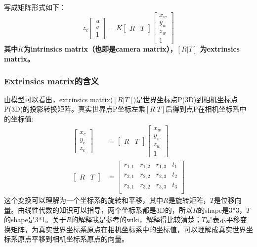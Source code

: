 \documentclass[UTF8]{ctexart}
\begin{document}
写成矩阵形式如下：
\begin{equation}       %
z_c \left[ \begin{array}{c}  u \\ v \\  1 \end{array} \right] =
K \left[ \begin{array}{c|c} R & T   \end{array} \right] \left[ \begin{array}{c}   x_w \\  y_w \\  z_w \\ 1 \end{array}\right]
\end{equation}
\textbf{其中$K$为intrinsics matrix（也即是camera matrix），$[R|T]$ 为extrinsics matrix\cite{wikiCameraresectioning18830}。}
\subsubsection{Extrinsics matrix的含义}
由模型可以看出，extrinsics matrix($[R|T]$)是世界坐标点P(3D)到相机坐标点P(3D)的投影转换矩阵。真实世界点P坐标左乘$[R|T]$后得到点P在相机坐标系中的坐标值:
\begin{align}
 \left[ \begin{array}{c}  x_c \\ y_c \\  z_c \end{array} \right] &=
 \left[ \begin{array}{c|c} R & T   \end{array} \right] \left[ \begin{array}{c}   x_w \\  y_w \\  z_w \\ 1 \end{array}\right]\\
 \left[ \begin{array}{c|c} R & T   \end{array} \right] &=
\left[ \begin{array}{ccc|c}
r_{1,1} & r_{1,2} & r_{1,3} & t_1 \\
r_{2,1} & r_{2,2} & r_{2,3} & t_2 \\
r_{3,1} & r_{3,2} & r_{3,3} & t_3 \\
\end{array} \right]
\end{align}
这个变换可以理解为一个坐标系的旋转和平移，其中$R$是旋转矩阵，$T$是位移向量。由线性代数的知识可以指导，两个坐标系都是3D的，所以$R$的shape是3*3，$T$的shape是3*1。关于$R$的解释我是参考的wiki\cite{wikiRotationmatrix18830}，解释得比较清楚；$T$是表示平移变换矩阵，为真实世界坐标系原点在相机坐标系中的坐标值，可以理解成真实世界坐标系原点平移到相机坐标系原点的向量。
\end{document}
